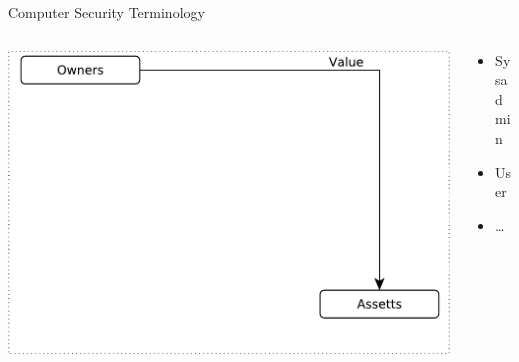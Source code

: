 \documentclass{beamer}
\begin{document}
\begin{frame}{Computer Security Terminology}
\begin{columns}[onlytextwidth]
    \begin{column}{0.6\textwidth}
\includegraphics[width=1\linewidth]{term-1}
  \end{column}
    \begin{column}{0.4\textwidth}
  \begin{itemize}
  \item Sysadmin
  \item User
  \item \dots
  \end{itemize}
  \end{column}
\end{columns}
\end{frame}
\end{document}
